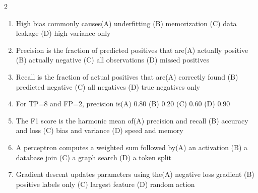 \documentclass[a4paper]{article}
\begin{document}
\begin{multicols*}{2}
\fontsize{8.5}{10}\selectfont
\begin{enumerate}[resume]
\item High bias commonly causes\newline\hspace*{0.6em}(A) underfitting \quad (B) memorization \newline\hspace*{0.6em}(C) data leakage \quad (D) high variance only
\item Precision is the fraction of predicted positives that are\newline\hspace*{0.6em}(A) actually positive \quad (B) actually negative \newline\hspace*{0.6em}(C) all observations \quad (D) missed positives
\item Recall is the fraction of actual positives that are\newline\hspace*{0.6em}(A) correctly found \quad (B) predicted negative \newline\hspace*{0.6em}(C) all negatives \quad (D) true negatives only
\item For TP=8 and FP=2, precision is\newline\hspace*{0.6em}(A) 0.80 \quad (B) 0.20 \newline\hspace*{0.6em}(C) 0.60 \quad (D) 0.90
\item The F1 score is the harmonic mean of\newline\hspace*{0.6em}(A) precision and recall \quad (B) accuracy and loss \newline\hspace*{0.6em}(C) bias and variance \quad (D) speed and memory
\item A perceptron computes a weighted sum followed by\newline\hspace*{0.6em}(A) an activation \quad (B) a database join \newline\hspace*{0.6em}(C) a graph search \quad (D) a token split
\item Gradient descent updates parameters using the\newline\hspace*{0.6em}(A) negative loss gradient \quad (B) positive labels only \newline\hspace*{0.6em}(C) largest feature \quad (D) random action

\end{enumerate}
\end{multicols*}
\end{document}
